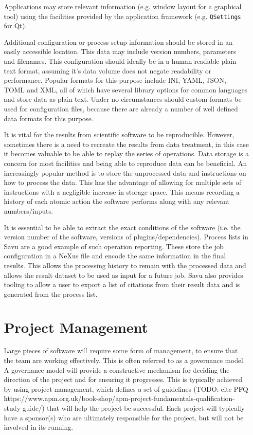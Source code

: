 \documentclass[jnr]{iosart2x}
\begin{document}
\begin{itemzie}
Applications may store relevant information (e.g. window layout for a graphical tool) using the facilities provided by the application framework (e.g. \texttt{QSettings} for Qt).

Additional configuration or process setup information should be stored in an easily accessible location.
This data may include version numbers, parameters and filenames.
This configuration should ideally be in a human readable plain text format, assuming it's data volume does not negate readability or performance.
Popular formats for this purpose include INI, YAML, JSON, TOML and XML, all of which have several library options for common languages and store data as plain text.
Under no circumstances should custom formats be used for configuration files, because there are already a number of well defined data formats for this purpose.

It is vital for the results from scientific software to be reproducible.
However, sometimes there is a need to recreate the results from data treatment, in this case it becomes valuable to be able to replay the series of operations.
Data storage is a concern for most facilities and being able to reproduce data can be beneficial.
An increasingly popular method is to store the unprocessed data and instructions on how to process the data.
This has the advantage of allowing for multiple sets of instructions with a negligible increase in storage space.
This means recording a history of each atomic action the software performs along with any relevant numbers/inputs.

It is essential to be able to extract the exact conditions of the software (i.e. the version number of the software, versions of plugins/dependencies).
Process lists in Savu \cite{Wadeson_2016} are a good example of such operation reporting.
These store the job configuration in a NeXus file and encode the same information in the final results.
This allows the processing history to remain with the processed data and allows the result dataset to be used as input for a future job.
Savu also provides tooling to allow a user to export a list of citations from their result data and is generated from the process list.

\section{Project Management}
\label{Project Management}

Large pieces of software will require some form of management, to ensure that the team are working effectively.
This is often referred to as a governance model.
A governance model will provide a constructive mechanism for deciding the direction of the project and for ensuring it progresses.
This is typically achieved by using project management, which defines a set of guidelines (TODO: cite PFQ https://www.apm.org.uk/book-shop/apm-project-fundamentals-qualification-study-guide/) that will help the project be successful.
Each project will typically have a sponsor(s) who are ultimately responsible for the project, but will not be involved in its running.


\end{itemzie}
\end{document}
